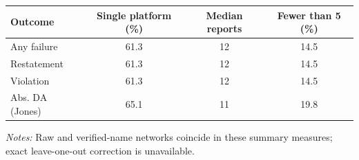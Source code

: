 \documentclass[10pt]{article}
\begin{document}
\begin{minipage}{19cm}\fontsize{10}{12}\selectfont\setlength{\tabcolsep}{4pt}\renewcommand{\arraystretch}{1.12}


\centering
{}
\begin{threeparttable}
\begin{tabular}{p{}ccc}
\toprule
Outcome & Single platform (\%) & Median reports & Fewer than 5 (\%) \\
\midrule
Any failure & 61.3 & 12 & 14.5 \\
Restatement & 61.3 & 12 & 14.5 \\
Violation & 61.3 & 12 & 14.5 \\
Abs. DA (Jones) & 65.1 & 11 & 19.8 \\
\bottomrule
\end{tabular}
\begin{tablenotes}\fontsize{9}{11}\selectfont
\item \raggedright \fontsize{9}{11}\selectfont \textit{Notes:} Raw and verified-name networks coincide in these summary measures; exact leave-one-out correction is unavailable.
\end{tablenotes}
\end{threeparttable}

\end{minipage}
\end{document}
